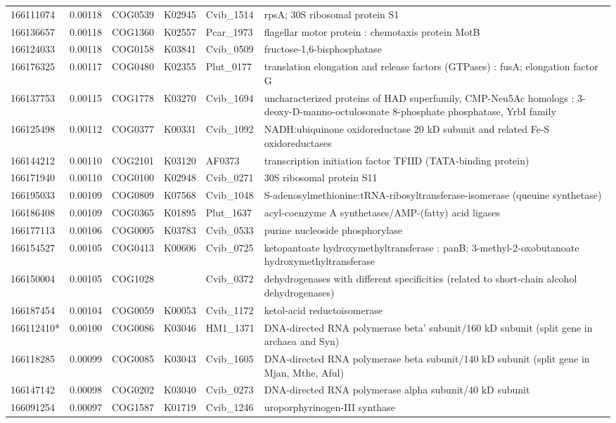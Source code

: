 \begin{landscape}
\begin{longtable}{p{1.8cm}p{0.9cm}p{2.2cm}p{1cm}p{2.8cm}p{13.4cm}}
166111074&0.00118&COG0539&K02945&Cvib\_1514&rpsA; 30S ribosomal protein S1 \\
166136657&0.00118&COG1360&K02557&Pcar\_1973&flagellar motor protein : chemotaxis protein MotB \\
166124033&0.00118&COG0158&K03841&Cvib\_0509&fructose-1,6-bisphosphatase \\
166176325&0.00117&COG0480&K02355&Plut\_0177&translation elongation and release factors (GTPases) : fusA; elongation factor G \\
166137753&0.00115&COG1778&K03270&Cvib\_1694&uncharacterized proteins of HAD superfamily, CMP-Neu5Ac homologs : 3-deoxy-D-manno-octulosonate 8-phosphate phosphatase, YrbI family \\
166125498&0.00112&COG0377&K00331&Cvib\_1092&NADH:ubiquinone oxidoreductase 20 kD subunit and related Fe-S oxidoreductases \\
166144212&0.00110&COG2101&K03120&AF0373&transcription initiation factor TFIID (TATA-binding protein) \\
166171940&0.00110&COG0100&K02948&Cvib\_0271&30S ribosomal protein S11 \\
166195033&0.00109&COG0809&K07568&Cvib\_1048&S-adenosylmethionine:tRNA-ribosyltransferase-isomerase (queuine synthetase) \\
166186408&0.00109&COG0365&K01895&Plut\_1637&acyl-coenzyme A synthetases/AMP-(fatty) acid ligases \\
166177113&0.00106&COG0005&K03783&Cvib\_0533&purine nucleoside phosphorylase \\
166154527&0.00105&COG0413&K00606&Cvib\_0725&ketopantoate hydroxymethyltransferase : panB; 3-methyl-2-oxobutanoate hydroxymethyltransferase \\
166150004&0.00105&COG1028&&Cvib\_0372&dehydrogenases with different specificities (related to short-chain alcohol dehydrogenases) \\
166187454&0.00104&COG0059&K00053&Cvib\_1172&ketol-acid reductoisomerase \\
166112410*&0.00100&COG0086&K03046&HM1\_1371&DNA-directed RNA polymerase beta' subunit/160 kD subunit (split gene in archaea and Syn) \\
166118285&0.00099&COG0085&K03043&Cvib\_1605&DNA-directed RNA polymerase beta subunit/140 kD subunit (split gene in Mjan, Mthe, Aful) \\
166147142&0.00098&COG0202&K03040&Cvib\_0273&DNA-directed RNA polymerase alpha subunit/40 kD subunit \\
166091254&0.00097&COG1587&K01719&Cvib\_1246&uroporphyrinogen-III synthase \\

\end{longtable}
\end{landscape}
